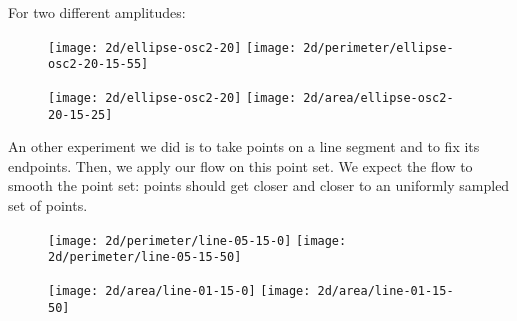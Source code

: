 For two different amplitudes:

\begin{figure}[H]
    \centering

    \texttt{[image: 2d/ellipse-osc2-20]}
    \texttt{[image: 2d/perimeter/ellipse-osc2-20-15-55]}
    \label{fig:ellipse_osc2_perimeter_flow}

    \texttt{[image: 2d/ellipse-osc2-20]}
    \texttt{[image: 2d/area/ellipse-osc2-20-15-25]}
    \label{fig:ellipse_osc2_area_flow}
\end{figure}


An other experiment we did is to take points on a line segment and to fix its
endpoints. Then, we apply our flow on this point set. We expect the flow to
smooth the point set: points should get closer and closer to an uniformly
sampled set of points.

\begin{figure}[H]
    \centering

    \texttt{[image: 2d/perimeter/line-05-15-0]}
    \texttt{[image: 2d/perimeter/line-05-15-50]}
    \label{fig:line_fixed_perimeter}

    \texttt{[image: 2d/area/line-01-15-0]}
    \texttt{[image: 2d/area/line-01-15-50]}
    \label{fig:line_fixed_area}
\end{figure}



